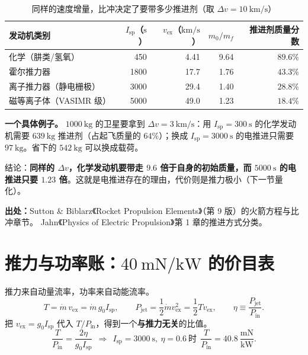 \begin{table}[htbp]
\centering
\small
\caption{同样的速度增量，比冲决定了要带多少推进剂（取 $\Delta v=10\ \mathrm{km/s}$）}
\label{tab:app-o-isp}
\begin{tabular}{@{}lrrrr@{}}
\toprule
发动机类别 & $I_{\mathrm{sp}}$（$\mathrm{s}$） & $v_{\mathrm{ex}}$（$\mathrm{km/s}$） & $m_0/m_f$ & 推进剂质量分数 \\
\midrule
化学（肼类/氢氧） & 450 & 4.41 & 9.64 & $89.6\%$ \\
霍尔推力器 & 1800 & 17.7 & 1.76 & $43.3\%$ \\
离子推力器（静电栅极） & 3000 & 29.4 & 1.40 & $28.8\%$ \\
磁等离子体（VASIMR 级） & 5000 & 49.0 & 1.23 & $18.4\%$ \\
\bottomrule
\end{tabular}
\end{table}

\textbf{一个具体例子。} $1000\ \mathrm{kg}$ 的卫星要拿到 $\Delta v=3\ \mathrm{km/s}$：用 $I_{\mathrm{sp}}=300\ \mathrm{s}$ 的化学发动机需要 $639\ \mathrm{kg}$ 推进剂（占起飞质量的 $64\%$）；换成 $I_{\mathrm{sp}}=3000\ \mathrm{s}$ 的电推进只需要 $97\ \mathrm{kg}$。省下的 $542\ \mathrm{kg}$ 可以换成载荷。

结论：\textbf{同样的 $\Delta v$，化学发动机要带走 $9.6$ 倍于自身的初始质量，而 $5000\ \mathrm{s}$ 的电推进只要 $1.23$ 倍}。这就是电推进存在的理由，代价则是推力极小（下一节量化）。

{\footnotesize
\textbf{出处：}Sutton \& Biblarz《Rocket Propulsion Elements》（第 9 版）的火箭方程与比冲章节。
Jahn《Physics of Electric Propulsion》第 1 章的推进方式分类。
}


\section{推力与功率账：\texorpdfstring{$40\ \mathrm{mN/kW}$}{40 mN/kW} 的价目表}

推力来自动量流率，功率来自动能流率。
\begin{equation}
T=\dot m\,v_{\mathrm{ex}}=\dot m\,g_0I_{\mathrm{sp}},
\qquad
P_{\mathrm{jet}}=\frac12\dot m v_{\mathrm{ex}}^2=\frac12Tv_{\mathrm{ex}},
\qquad
\eta\equiv\frac{P_{\mathrm{jet}}}{P_{\mathrm{in}}}.
\label{eq:app-o-thrust}
\end{equation}
把 $v_{\mathrm{ex}}=g_0I_{\mathrm{sp}}$ 代入 $T/P_{\mathrm{in}}$，得到一个\textbf{与推力无关}的比值。
\begin{equation}
\frac{T}{P_{\mathrm{in}}}=\frac{2\eta}{g_0I_{\mathrm{sp}}}
\ \ \Longrightarrow\ \
I_{\mathrm{sp}}=3000\ \mathrm{s},\ \eta=0.6\ \text{时}\ \ \frac{T}{P_{\mathrm{in}}}=40.8\ \frac{\mathrm{mN}}{\mathrm{kW}}.
\label{eq:app-o-tpratio}
\end{equation}

